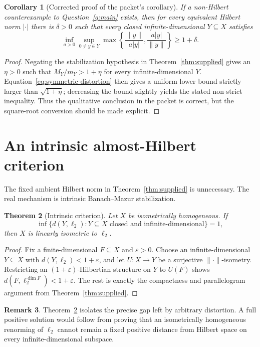 \documentclass[11pt]{article}
\newtheorem{theorem}{Theorem}[section]
\newtheorem{corollary}[theorem]{Corollary}
\theoremstyle{definition}
\newtheorem{remark}[theorem]{Remark}
\begin{document}
\begin{corollary}[Corrected proof of the packet's corollary]\label{cor:packet}
If a non-Hilbert counterexample to Question~\ref{q:main} exists, then for every
equivalent Hilbert norm $|\cdot|$ there is $\delta>0$ such that every closed
infinite-dimensional $Y\subseteq X$ satisfies
\[
 \inf_{a>0}\sup_{0\ne y\in Y}
 \max\left\{\frac{\|y\|}{a|y|},\frac{a|y|}{\|y\|}\right\}
 \geq1+\delta.
\]
\end{corollary}

\begin{proof}
Negating the stabilization hypothesis in Theorem~\ref{thm:supplied} gives an
$\eta>0$ such that $M_Y/m_Y>1+\eta$ for every infinite-dimensional $Y$.
Equation~\eqref{eq:symmetric-distortion} then gives a uniform lower bound
strictly larger than $\sqrt{1+\eta}$; decreasing the bound slightly yields the
stated non-strict inequality.  Thus the qualitative conclusion in the packet
is correct, but the square-root conversion should be made explicit.
\end{proof}

\section{An intrinsic almost-Hilbert criterion}\label{sec:intrinsic}

The fixed ambient Hilbert norm in Theorem~\ref{thm:supplied} is unnecessary.
The real mechanism is intrinsic Banach--Mazur stabilization.

\begin{theorem}[Intrinsic criterion]\label{thm:intrinsic}
Let $X$ be isometrically homogeneous.  If
\[
 \inf\{d(Y,\ell_2):Y\subseteq X\text{ closed and infinite-dimensional}\}=1,
\]
then $X$ is linearly isometric to $\ell_2$.
\end{theorem}

\begin{proof}
Fix a finite-dimensional $F\subseteq X$ and $\varepsilon>0$.  Choose an
infinite-dimensional $Y\subseteq X$ with $d(Y,\ell_2)<1+\varepsilon$, and let
$U:X\to Y$ be a surjective $\|\cdot\|$-isometry.  Restricting an
$(1+\varepsilon)$-Hilbertian structure on $Y$ to $U(F)$ shows
$d(F,\ell_2^{\dim F})<1+\varepsilon$.  The rest is exactly the compactness and
parallelogram argument from Theorem~\ref{thm:supplied}.
\end{proof}

\begin{remark}
Theorem~\ref{thm:intrinsic} isolates the precise gap left by arbitrary
distortion.  A full positive solution would follow from proving that an
isometrically homogeneous renorming of $\ell_2$ cannot remain a fixed positive
distance from Hilbert space on every infinite-dimensional subspace.
\end{remark}
\end{document}
